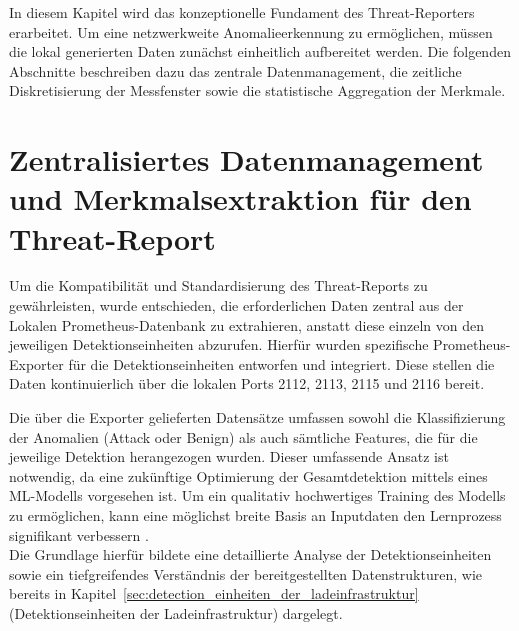 In diesem Kapitel wird das konzeptionelle Fundament des Threat-Reporters erarbeitet. Um eine netzwerkweite Anomalieerkennung zu ermöglichen, müssen die lokal generierten Daten zunächst einheitlich aufbereitet werden. Die folgenden Abschnitte beschreiben dazu das zentrale Datenmanagement, die zeitliche Diskretisierung der Messfenster sowie die statistische Aggregation der Merkmale.   
   
   \section{Zentralisiertes Datenmanagement und Merkmalsextraktion für den Threat-Report}
    \label{sec:treat_report_datenmanagement}

    Um die Kompatibilität und Standardisierung des Threat-Reports zu gewährleisten, wurde entschieden, die erforderlichen Daten zentral aus der Lokalen Prometheus-Datenbank zu extrahieren, anstatt diese einzeln von den jeweiligen Detektionseinheiten abzurufen. Hierfür wurden spezifische Prometheus-Exporter für die Detektionseinheiten entworfen und integriert. Diese stellen die Daten kontinuierlich über die lokalen Ports 2112, 2113, 2115 und 2116 bereit.

    Die über die Exporter gelieferten Datensätze umfassen sowohl die Klassifizierung der Anomalien (Attack oder Benign) als auch sämtliche Features, die für die jeweilige Detektion herangezogen wurden. Dieser umfassende Ansatz ist notwendig, da eine zukünftige Optimierung der Gesamtdetektion mittels eines ML-Modells vorgesehen ist. Um ein qualitativ hochwertiges Training des Modells zu ermöglichen, kann eine möglichst breite Basis an Inputdaten den Lernprozess signifikant verbessern \cite{heigl2021exploiting}.\\
    
    Die Grundlage hierfür bildete eine detaillierte Analyse der Detektionseinheiten sowie ein tiefgreifendes Verständnis der bereitgestellten Datenstrukturen, wie bereits in Kapitel~\ref{sec:detection_einheiten_der_ladeinfrastruktur} (Detektionseinheiten der Ladeinfrastruktur) dargelegt.


